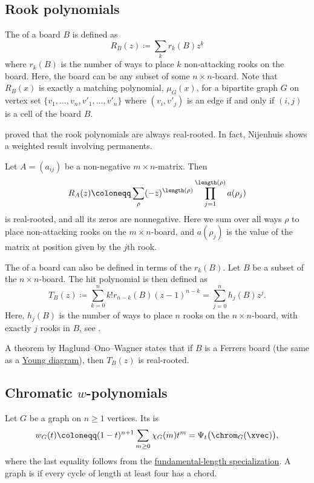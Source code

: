\subsection[rookPolynomials]{Rook polynomials}

The \label{rookPolynomial} of a board $B$ is defined as
\[
  R_B(z) \coloneqq \sum_k r_k(B) z^k
\]
where $r_k(B)$ is the number of ways to place $k$ non-attacking rooks on the
board.
Here, the board can be any subset of some $n {\times} n$-board.
Note that $R_B(x)$ is exactly a matching polynomial, $\mu_G(x)$, for a
bipartite graph $G$ on vertex set $\{v_1,\dotsc,v_n,v'_1,\dotsc,v'_n\}$
where  $(v_i,v'_j)$ is an edge if and only if $(i,j)$ is a cell of the board $B$.

 \cite{Nijenhuis1976} proved that the rook polynomials
are always real-rooted.
In fact, Nijenhuis shows a weighted result involving permanents.
\begin{theorem}[Nijenhuis, 1976]
Let $A = (a_{ij})$ be a non-negative $m\times n$-matrix.
Then
\[
 R_{A}(z) \coloneqq \sum_{\rho} (-z)^{\length(\rho)} \prod_{j=1}^{\length(\rho)}
  a(\rho_j)
\]
is real-rooted, and all its zeros are nonnegative.  Here we sum over all
ways $\rho$ to place non-attacking rooks on the $m\times n$-board,
and $a(\rho_j)$ is the value of the matrix at position given by the $j$th rook.
\end{theorem}


The \label{hitPolynomial} of a board can also be defined
in terms of the $r_k(B)$.
Let $B$ be a subset of the $n\times n$-board.
The hit polynomial is then defined as
\[
 T_B(z) \coloneqq \sum_{k =0}^n k! r_{n-k}(B)(z-1)^{n-k} = \sum_{j=0}^n h_j(B) z^j.
\]
Here, $h_j(B)$ is the number of ways to place $n$ rooks on the $n \times n$-board,
with exactly $j$ rooks in $B$, see \cite{KaplanskyRiordan1946,Haglund2000}.

A theorem by Haglund--Ono--Wagner \cite{HaglundOnoWagner1999}
states that if $B$ is a Ferrers board (the same as a
\hyperref[youngDiagram]{Young diagram}),
then $T_B(z)$ is real-rooted.


\subsection[realRootedChromaticW]{Chromatic $w$-polynomials}

Let $G$ be a graph on $n\geq1$ vertices.  Its
 is
\[
 w_G(t)
 \coloneqq
 (1-t)^{n+1}\sum_{m\geq0}\chi_G(m)t^m
 =\Psi_t\bigl(\chrom_G(\xvec)\bigr),
\]
where the last equality follows from the
\hyperref[gesselLengthSpecialization]{fundamental-length specialization}.
A graph is \label{chordalGraph} if every cycle of length at
least four has a chord.

